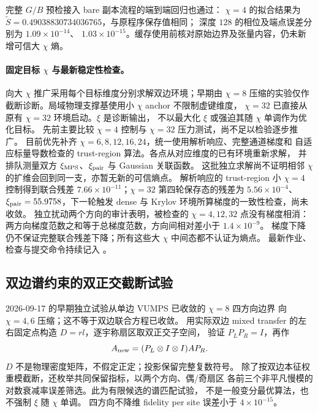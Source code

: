 \documentclass[11pt]{article}
\newcommand{\tS}{\widetilde S}
\begin{document}
完整 $G/B$ 预检接入 bare 副本流程的端到端回归也通过：
$\chi=4$ 的拟合结果为 $\tS=0.49038830734036765$，与原程序保存值相同；
深度 $128$ 的相位及端点误差分别为 $1.09\times10^{-14}$、
$1.03\times10^{-15}$。缓存使用前核对原始边界及张量内容，仍未新增可信大 $\chi$ 熵。

\paragraph{固定目标 $\chi$ 与最新稳定性检查。}
向大 $\chi$ 推广采用每个目标维度分别求解双边环境；早期由 $\chi=8$
压缩的实验仅作截断诊断。局域物理支撑基使用小 $\chi$ anchor 不限制虚键维度，
$\chi=32$ 已直接从原有 $\chi=32$ 环境启动。$\xi$ 是诊断输出，
不以最大化 $\xi$ 或强迫其随 $\chi$ 单调作为优化目标。
先前主要比较 $\chi=4$ 控制与 $\chi=32$ 压力测试，尚不足以检验逐步推广。
目前优先补齐 $\chi=6,8,12,16,24$，统一使用解析响应、完整通道梯度和
自适应标量导数检查的 trust-region 算法。各点从对应维度的已有环境重新求解，
并排队测量双方 $\xi_{\rm MPS}$、$\xi_{\rm pair}$ 与 Gaussian 关联函数。
这批独立求解尚不证明相邻 $\chi$ 的扩维会回到同一支，亦暂无新的可信熵点。
解析响应的 trust-region 小 $\chi=4$ 控制得到联合残差
$7.66\times10^{-11}$；$\chi=32$ 第四轮保存态的残差为
$5.56\times10^{-4}$、$\xi_{\rm pair}=55.9758$，下一轮触发
dense 与 Krylov 环境所算梯度的一致性检查，尚未收敛。
独立扰动两个方向的审计表明，被检查的 $\chi=4,12,32$ 点没有梯度相消：
两方向梯度范数之和等于总梯度范数，方向间相对差小于 $1.4\times10^{-9}$。
梯度下降仍不保证完整联合残差下降；所有这些大 $\chi$ 中间态都不认证为熵点。
最新作业、检查与提交命令持续记入
。

\subsection{双边谱约束的双正交截断试验}

2026-09-17 的早期独立试验从单边 VUMPS 已收敛的 $\chi=8$ 四方向边界
向 $\chi=4,6$ 压缩；这不等于双边联合方程已收敛。
用实际双边 mixed transfer 的左右固定点构造 $D=rl$，逐宇称扇区取双正交子空间，
验证 $P_LP_R=I$，再作
\begin{equation}
 A_{\rm new}=(P_L\otimes I\otimes I)A P_R.
\end{equation}
$D$ 不是物理密度矩阵，不假定正定；投影保留完整复数符号。
除了按双边本征权重模截断，还枚举共同保留指标，以两个方向、偶/奇扇区
各前三个非平凡慢模的对数衰减率误差筛选。此为有限候选的谱匹配试验，
不是一般变分最优算法，也不强制 $\xi$ 随 $\chi$ 单调。
四方向不降维 fidelity per site 误差小于 $4\times10^{-15}$。
\end{document}
